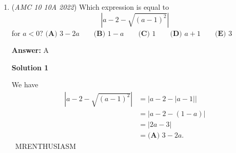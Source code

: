 \begin{enumerate}
 The only answer choice that appears in our solution is $-\sqrt{2}+2$, or $\boxed{\textbf{(C) }2-{\sqrt2}}$.

 



\textbf{Solution 5 (Similar to Solution 1)}

$AS=s$ and $SD=\frac{\sqrt{2}}{2}s$ based on \href{https://artofproblemsolving.com/wiki/index.php?title=Special\_right\_triangles}{45-45-90 Triangles}(refer to Solution 1 why) so $s=\frac{1}{1+\frac{\sqrt{2}}{2}}$. Simplify and get $\boxed{\textbf{(C) }2-{\sqrt2}}$.

 



\textbf{Solution 6 (Easy, Fast Pythagorean Theorem)}

Just find a corner of the square to find a right triangle with side lengths $1-s$, $1-s$, and $s$.

 Using the Pythagorean Theorem:
 \[(1-s)^2 + (1-s)^2 = s^2\]

 Simplifying the equation gives:
 \[s^2 - 4s + 2 = 0\]

 Applying the quadratic formula:\begin{align*}s &= \frac{4 \pm \sqrt{16-8}}{2} \\&= \frac{4 \pm \sqrt{8}}{2} \\&= 2 \pm \frac{\sqrt{8}}{2} \\&= 2 \pm \sqrt{2}\end{align*}


 Since $s$ must be smaller than $1$, we discard the positive root. This leaves us with $2 - \sqrt{2}$, which is $\boxed{\textbf{(C) } 2-\sqrt{2}}$.

 


	\item (\textit{AMC 10 10A 2022}) Which expression is equal to 
 \[\left|a-2-\sqrt{(a-1)^2}\right|\] for $a<0?$
$\textbf{(A) } 3-2a \qquad \textbf{(B) } 1-a \qquad \textbf{(C) } 1 \qquad \textbf{(D) } a+1 \qquad \textbf{(E) } 3$

 \textbf{Answer: }A



\textbf{Solution 1}

We have 
 \begin{align*} \left|a-2-\sqrt{(a-1)^2}\right| &= \left|a-2-|a-1|\right| \\ &=\left|a-2-(1-a)\right| \\ &=\left|2a-3\right| \\ &=\boxed{\textbf{(A) } 3-2a}. \end{align*}
~MRENTHUSIASM


\end{enumerate}
